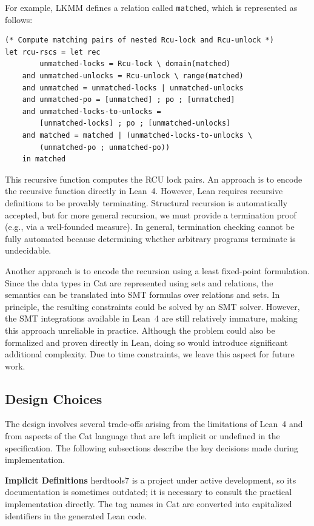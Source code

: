 For example, LKMM defines a relation called \texttt{matched}, which is represented as follows:

\begin{verbatim}
(* Compute matching pairs of nested Rcu-lock and Rcu-unlock *)
let rcu-rscs = let rec
        unmatched-locks = Rcu-lock \ domain(matched)
    and unmatched-unlocks = Rcu-unlock \ range(matched)
    and unmatched = unmatched-locks | unmatched-unlocks
    and unmatched-po = [unmatched] ; po ; [unmatched]
    and unmatched-locks-to-unlocks =
        [unmatched-locks] ; po ; [unmatched-unlocks]
    and matched = matched | (unmatched-locks-to-unlocks \
        (unmatched-po ; unmatched-po))
    in matched
\end{verbatim}
This recursive function computes the RCU lock pairs. An approach is to encode the recursive function directly in Lean~4. However, Lean requires recursive definitions to be provably terminating. Structural recursion is automatically accepted, but for more general recursion, we must provide a termination proof (e.g., via a well-founded measure). In general, termination checking cannot be fully automated because determining whether arbitrary programs terminate is undecidable.

Another approach is to encode the recursion using a least fixed-point formulation. Since the data types in Cat are represented using sets and relations, the semantics can be translated into SMT formulas over relations and sets. In principle, the resulting constraints could be solved by an SMT solver. However, the SMT integrations available in Lean~4 are still relatively immature, making this approach unreliable in practice. Although the problem could also be formalized and proven directly in Lean, doing so would introduce significant additional complexity. Due to time constraints, we leave this aspect for future work.

\subsection{Design Choices}
The design involves several trade-offs arising from the limitations of Lean~4 and from aspects of the Cat language that are left implicit or undefined in the specification. The following subsections describe the key decisions made during implementation.

\textbf{Implicit Definitions}
herdtools7 is a project under active development, so its documentation is sometimes outdated; it is necessary to consult the practical implementation directly. The tag names in Cat are converted into capitalized identifiers in the generated Lean code.

